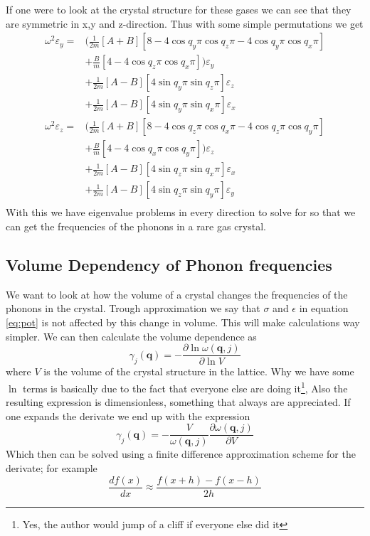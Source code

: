 \documentclass[11pt]{article}
\begin{document}
If one were to look at the crystal structure for these gases we can see that they are symmetric in x,y and z-direction. Thus with some simple permutations we get
\begin{align}
	\omega^2\varepsilon_y = &\big( \frac{1}{2m} [A+B][8-4\cos{q_y\pi}\cos{q_z\pi}-4\cos{q_y\pi}\cos{q_x\pi}] \\
	&+ \frac{B}{m}[4-4\cos{q_z\pi}\cos{q_x\pi}]\big)\varepsilon_y \\
	&+\frac{1}{2m}[A-B][4\sin{q_y\pi}\sin{q_z\pi}]\varepsilon_z \\
	&+\frac{1}{2m}[A-B][4\sin{q_y\pi}\sin{q_x\pi}]\varepsilon_x \\
	\omega^2\varepsilon_z = &\big( \frac{1}{2m} [A+B][8-4\cos{q_z\pi}\cos{q_x\pi}-4\cos{q_z\pi}\cos{q_y\pi}] \\
	&+ \frac{B}{m}[4-4\cos{q_x\pi}\cos{q_y\pi}]\big)\varepsilon_z \\
	&+\frac{1}{2m}[A-B][4\sin{q_z\pi}\sin{q_x\pi}]\varepsilon_x \\
	&+\frac{1}{2m}[A-B][4\sin{q_z\pi}\sin{q_y\pi}]\varepsilon_y \\
	\label{eq:omegaRest}
\end{align}
With this we have eigenvalue problems in every direction to solve for so that we can get the frequencies of the phonons in a rare gas crystal.
\subsection{Volume Dependency of Phonon frequencies}
We want to look at how the volume of a crystal changes the frequencies of the phonons in the crystal. Trough approximation we say that $\sigma$ and $\epsilon$ in equation \ref{eq:pot} is not affected by this change in volume. This will make calculations way simpler. We can then calculate the volume dependence as 
\begin{equation}
	\gamma_j(\mathbf{q}) = - \frac{\partial \ln{ \omega(\mathbf{q},j)}}{\partial \ln{V}}
\end{equation}
where $V$ is the volume of the crystal structure in the lattice. Why we have some $\ln$ terms is basically due to the fact that everyone else are doing it\footnote{Yes, the author would jump of a cliff if everyone else did it}, Also the resulting expression is dimensionless, something that always are appreciated. If one expands the derivate we end up with the expression
\begin{equation}
	\gamma_j(\mathbf{q}) =  -\frac{V}{\omega(\mathbf{q},j)} \frac{\partial \omega(\mathbf{q},j)}{\partial V}
	\label{eq:volDep}
\end{equation}
Which then can be solved using a finite difference approximation scheme for the derivate; for example
\begin{equation}
	\frac{df(x)}{dx} \approx \frac{f(x+h)-f(x-h)}{2h}
	\label{eq:derivate}
\end{equation}
\end{document}
